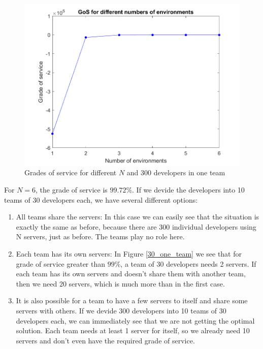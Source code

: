 \documentclass[a4paper]{article}
\begin{document}
\begin{figure}[h!]
\includegraphics[scale=0.7]{plots/Grade_of_service_300_developers.png}
\caption{Grades of service for different $N$ and 300 developers in one team}
\label{300_one_team}
\end{figure}  
For $N=6$, the grade of service is $99.72 \% $. If we devide the developers into 10 teams of 30 developers each, we have several different options:
\begin{enumerate}
\item All teams share the servers: In this case we can easily see that the situation is exactly the same as before, because there are 300 individual developers using N servers, just as before. The teams play no role here. 
\item Each team has its own servers: In  Figure \ref{30_one_team} we see that for grade of service greater than $99 \%$, a team of 30 developers needs 2 servers. If each team has its own servers and doesn't share them with another team, then we need 20 servers, which is much more than in the first case.
\item It is also possible for a team to have a few servers to itself and share some servers with others. If we devide 300 developers into 10 teams of 30 developers each, we can immediately see that we are not getting the optimal solution. Each team needs at least 1 server for itself, so we already need 10 servers and don't even have the required grade of service.
\end{enumerate}
\end{document}
